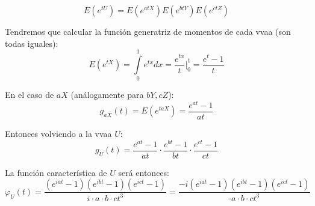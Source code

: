 \documentclass[openany]{book}
\begin{document}
\begin{exercise}
    $$E(e^{tU}) = E(e^{atX})E(e^{btY}) E(e^{ctZ}) $$

    Tendremos que calcular la función generatriz de momentos de cada vvaa (son todas iguales):
    $$ E(e^{tX}) = \int\limits_{0}^{1} e^{tx} dx = \dfrac{e^{tx}}{t} \Biggr|_{0}^{1} = \dfrac{e^{t}-1}{t} $$
    
    En el caso de $ aX $ (análogamente para $ bY,cZ $):
    $$ g_{aX}(t) = E(e^{taX}) = \dfrac{e^{at}-1}{at} $$

    Entonces volviendo a la vvaa $ U $:
    $$ g_{U}(t) = \dfrac{e^{at}-1}{at}\cdot \dfrac{e^{bt}-1}{bt}\cdot \dfrac{e^{ct}-1}{ct} $$

    La función característica de $ U $ será entonces:
    $$ \varphi_{U} (t) = \dfrac{(e^{iat}-1)(e^{ibt}-1)(e^{ict}-1)}{i\cdot a\cdot b\cdot c t^3}  = \dfrac{-i(e^{iat}-1)(e^{ibt}-1)(e^{ict}-1)}{\cdot a\cdot b\cdot c t^3}$$

\end{exercise}  
\end{document}
